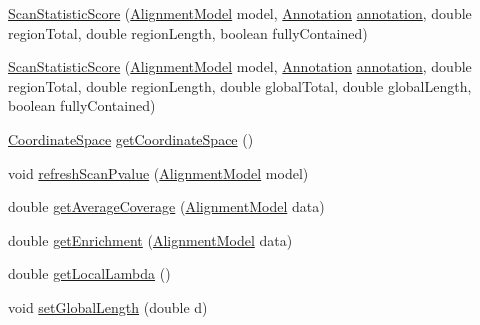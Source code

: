 \begin{DoxyCompactItemize}
\item 
\hyperlink{classumms_1_1core_1_1model_1_1score_1_1_scan_statistic_score_a7e59f106f0a82ba8e27274ad79efa24d}{Scan\+Statistic\+Score} (\hyperlink{classumms_1_1core_1_1model_1_1_alignment_model}{Alignment\+Model} model, \hyperlink{interfaceumms_1_1core_1_1annotation_1_1_annotation}{Annotation} \hyperlink{classumms_1_1core_1_1model_1_1score_1_1_window_score_1_1_abstract_window_score_a455fb02f18f492e611113b9da0a24888}{annotation}, double region\+Total, double region\+Length, boolean fully\+Contained)
\item 
\hyperlink{classumms_1_1core_1_1model_1_1score_1_1_scan_statistic_score_a400bc76a98137a85b80e2da0c1708cdb}{Scan\+Statistic\+Score} (\hyperlink{classumms_1_1core_1_1model_1_1_alignment_model}{Alignment\+Model} model, \hyperlink{interfaceumms_1_1core_1_1annotation_1_1_annotation}{Annotation} \hyperlink{classumms_1_1core_1_1model_1_1score_1_1_window_score_1_1_abstract_window_score_a455fb02f18f492e611113b9da0a24888}{annotation}, double region\+Total, double region\+Length, double global\+Total, double global\+Length, boolean fully\+Contained)
\item 
\hyperlink{interfaceumms_1_1core_1_1coordinatesystem_1_1_coordinate_space}{Coordinate\+Space} \hyperlink{classumms_1_1core_1_1model_1_1score_1_1_scan_statistic_score_a262bc285097a3dcd60b9c3d2ce81e0ed}{get\+Coordinate\+Space} ()
\item 
void \hyperlink{classumms_1_1core_1_1model_1_1score_1_1_scan_statistic_score_ac9d683c8f1fa4c0ca858610426c3c8db}{refresh\+Scan\+Pvalue} (\hyperlink{classumms_1_1core_1_1model_1_1_alignment_model}{Alignment\+Model} model)
\item 
double \hyperlink{classumms_1_1core_1_1model_1_1score_1_1_scan_statistic_score_a55e96afcf845400a7fbca4eb67874791}{get\+Average\+Coverage} (\hyperlink{classumms_1_1core_1_1model_1_1_alignment_model}{Alignment\+Model} data)
\item 
double \hyperlink{classumms_1_1core_1_1model_1_1score_1_1_scan_statistic_score_a2b410f5e59321ad692a8493e019932f2}{get\+Enrichment} (\hyperlink{classumms_1_1core_1_1model_1_1_alignment_model}{Alignment\+Model} data)
\item 
double \hyperlink{classumms_1_1core_1_1model_1_1score_1_1_scan_statistic_score_ade266a940c29a1911ff8252fdd6b1d73}{get\+Local\+Lambda} ()
\item 
void \hyperlink{classumms_1_1core_1_1model_1_1score_1_1_scan_statistic_score_aef1bab1d4217739b6c155cfd8745d331}{set\+Global\+Length} (double d)
\item 

\end{DoxyCompactItemize}
